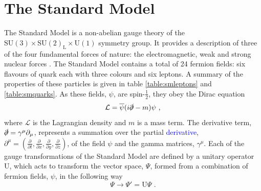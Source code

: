 \section{The Standard Model}
The Standard Model is a non-abelian gauge theory of the $\text{SU}(3) \times \text{SU}(2)_{\text{L}} \times \text{U}(1)$ symmetry group.  It provides a description of three of the four fundamental forces of nature: the electromagnetic, weak and strong nuclear forces \cite{Griffiths:1987tj,Peskin:1995ev}.  The Standard Model contains a total of 24 fermion fields: six flavours of quark each with three colours and six leptons.  A summary of the properties of these particles is given in table \ref{table:smleptons} and \ref{table:smquarks}.  As these fields, $\psi$, are spin-$\frac{1}{2}$, they obey the Dirac equation
%
\begin{equation}
\mathcal{L} = \overline{\psi}(i \slashed{\partial} - m)\psi \text{ ,}
\end{equation}
%
\noindent where $\mathcal{L}$ is the Lagrangian density and $m$ is a mass term.  The derivative term, $\slashed{\partial} = \gamma^{\mu}\partial_{\mu}$, represents a summation over the partial \textcolor{blue}{derivative}, $\partial^{\mu} = (\frac{\partial}{\partial{t}},\frac{\partial}{\partial{x}},\frac{\partial}{\partial{y}},\frac{\partial}{\partial{z}})$, of the field $\psi$ and the gamma matrices, $\gamma^{\mu}$.  Each of the gauge transformations of the Standard Model are defined by a unitary operator \textrm{U}, which acts to transform the vector space, $\Psi$, formed from a combination of fermion fields, $\psi$, in the following way
%
\begin{equation}
\Psi \rightarrow \Psi' = \textrm{U}\Psi \text{ .}
\end{equation}
%
